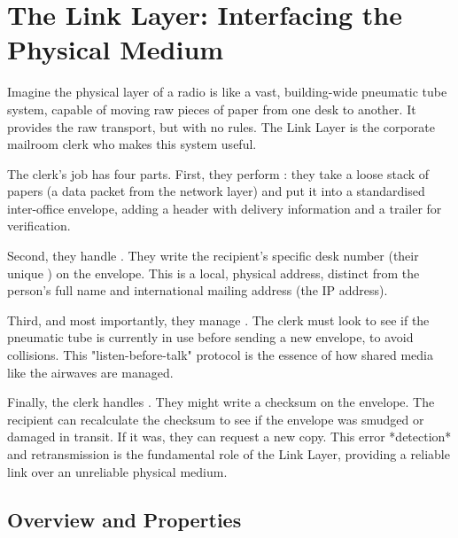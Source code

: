 
\chapter{The Link Layer: Interfacing the Physical Medium}
\label{ch:link-layer}

\begin{nontechnical}
    Imagine the physical layer of a radio is like a vast, building-wide pneumatic tube system, capable of moving raw pieces of paper from one desk to another. It provides the raw transport, but with no rules. The Link Layer is the corporate mailroom clerk who makes this system useful.

    The clerk's job has four parts. First, they perform : they take a loose stack of papers (a data packet from the network layer) and put it into a standardised inter-office envelope, adding a header with delivery information and a trailer for verification.

    Second, they handle . They write the recipient's specific desk number (their unique ) on the envelope. This is a local, physical address, distinct from the person's full name and international mailing address (the IP address).

    Third, and most importantly, they manage . The clerk must look to see if the pneumatic tube is currently in use before sending a new envelope, to avoid collisions. This "listen-before-talk" protocol is the essence of how shared media like the airwaves are managed.

    Finally, the clerk handles . They might write a checksum on the envelope. The recipient can recalculate the checksum to see if the envelope was smudged or damaged in transit. If it was, they can request a new copy. This error *detection* and retransmission is the fundamental role of the Link Layer, providing a reliable link over an unreliable physical medium.
\end{nontechnical}

\section{Overview and Properties}


